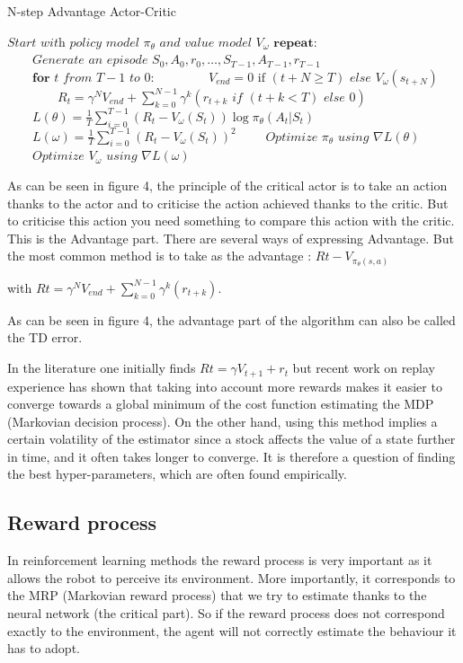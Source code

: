 \begin{algorithm}
\label{alga2c}
\caption{N-step Advantage Actor-Critic\label{a2c}}
\begin{algorithmic}[1]
\State $\textit{Start with policy model } \pi_\theta \textit{ and value model } V_\omega$
\State $\textbf{repeat:}$
\State $\qquad\textit{Generate an episode } S_0, A_0, r_0, \ldots, S_{T-1}, A_{T-1}, r_{T-1} $
\State $\qquad\textbf{for } t \textit{ from } T-1 \textit{ to } 0$:
\State $\qquad\qquad V_{end} = 0 \text{ if } (t+N \geq T) \textit{ else } V_\omega(s_{t+N})$
\State $\qquad\qquad R_t =\gamma^{N}V_{end}+\sum_{k=0}^{N-1} \gamma^k \left(r_{t+k} \textit{ if } (t+k < T) \textit{ else } 0\right)$ 
\State $\qquad L(\theta) = \frac{1}{T} \sum_{i=0}^{T-1} (R_t - V_\omega(S_t)) \log \pi_\theta(A_t | S_t)$
\State $\qquad L(\omega) = \frac{1}{T} \sum_{i=0}^{T-1} (R_t - V_\omega(S_t))^2$
\State $\qquad\textit{Optimize } \pi_\theta \textit{ using } \nabla L(\theta)$
\State $\qquad\textit{Optimize } V_\omega \textit{ using } \nabla L(\omega)$
\EndProcedure
\end{algorithmic}
\end{algorithm}
As can be seen in figure 4, the principle of the critical actor is to take an action thanks to the actor and to criticise the action achieved thanks to the critic. But to criticise this action you need something to compare this action with the critic. This is the Advantage part. 
There are several ways of expressing Advantage.
But the most common method is to take as the advantage :  $Rt - V_{\pi_{\theta}(s,a)}$

with $Rt =\gamma^{N}V_{end}+\sum_{k=0}^{N-1} \gamma^k (r_{t+k})$.

As can be seen in figure 4, the advantage part of the algorithm can also be called the TD error.

In the literature one initially finds $Rt =\gamma V_{t+1}+r_{t}$
but recent work on replay experience has shown that taking into account more rewards makes it easier to converge towards a global minimum of the cost function estimating the MDP (Markovian decision process).
On the other hand, using this method implies a certain volatility of the estimator since a stock affects the value of a state further in time, and it often takes longer to converge.
It is therefore a question of finding the best hyper-parameters, which are often found empirically.

\subsection{Reward process}
In reinforcement learning methods the reward process is very important as it allows the robot to perceive its environment. 
More importantly, it corresponds to the MRP (Markovian reward process) that we try to estimate thanks to the neural network (the critical part). 
So if the reward process does not correspond exactly to the environment, the agent will not correctly estimate the behaviour it has to adopt.

